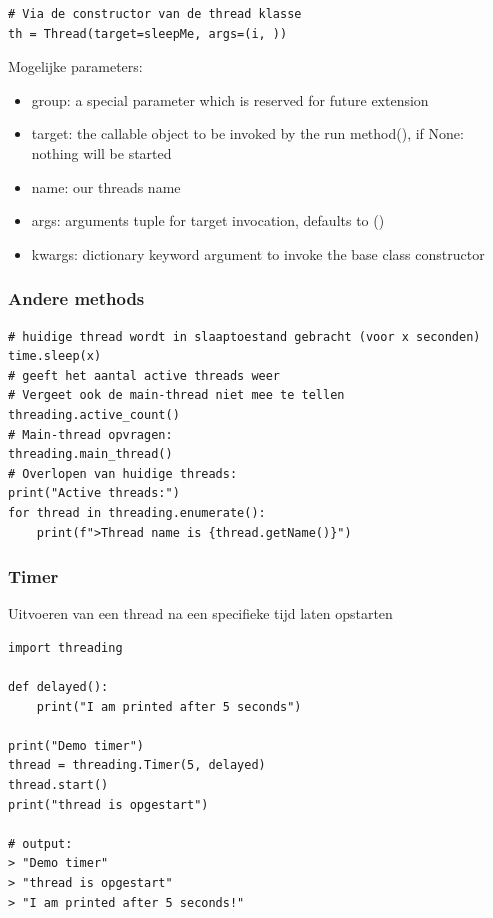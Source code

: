 \documentclass{article}
\begin{document}
\begin{verbatim}
# Via de constructor van de thread klasse
th = Thread(target=sleepMe, args=(i, ))
\end{verbatim}

Mogelijke parameters:

\begin{itemize}
    \item group: a special parameter which is reserved for future extension
    \item target: the callable object to be invoked by the run method(), if None: nothing will be started
    \item name: our threads name
    \item args: arguments tuple for target invocation, defaults to ()
    \item kwargs: dictionary keyword argument to invoke the base class constructor
\end{itemize}

\subsubsection{Andere methods}

\begin{verbatim}
# huidige thread wordt in slaaptoestand gebracht (voor x seconden)
time.sleep(x)
# geeft het aantal active threads weer
# Vergeet ook de main-thread niet mee te tellen
threading.active_count() 
# Main-thread opvragen: 
threading.main_thread()
# Overlopen van huidige threads:
print("Active threads:")
for thread in threading.enumerate():
    print(f">Thread name is {thread.getName()}")
\end{verbatim}

\subsubsection{Timer}

Uitvoeren van een thread na een specifieke tijd laten opstarten

\begin{verbatim}
import threading

def delayed():
    print("I am printed after 5 seconds")

print("Demo timer")
thread = threading.Timer(5, delayed)
thread.start()
print("thread is opgestart")

# output:
> "Demo timer"
> "thread is opgestart"
> "I am printed after 5 seconds!"
\end{verbatim}
\end{document}
